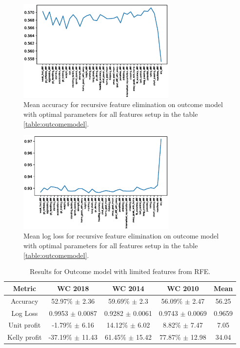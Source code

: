 \begin{figure}[H]
    \centering
    \includegraphics[width=0.7\textwidth]{img/optimal_avg_accuracy.eps}
    \caption{Mean accuracy for recursive feature elimination on outcome model with optimal parameters for all features setup in the table \ref{table:outcomemodel}.}
    \label{fig:optimal_avg_accu}
\end{figure}

\begin{figure}[H]
    \centering
    \includegraphics[width=0.7\textwidth]{img/optimal_avg_lloss.eps}
    \caption{Mean log loss for recursive feature elimination on outcome model with optimal parameters for all features setup in the table \ref{table:outcomemodel}.}
    \label{fig:optimal_avg_loss}
\end{figure}

\begin{table}
    \caption{Results for Outcome model with limited features from RFE.}
    \begin{tabular}{| c | c| c| c|c|}
        \hline
        Metric& \textbf{WC 2018} & \textbf{WC 2014} & \textbf{WC 2010} & Mean\\
        \hline
        Accuracy  & 52.97\% $\pm$ 2.36 & 59.69\% $\pm$ 2.3 & 56.09\% $\pm$ 2.47& 56.25 \\
        Log Loss & 0.9953 $\pm$ 0.0087 & 0.9282 $\pm$ 0.0061 & 0.9743 $\pm$ 0.0069& 0.9659 \\
        Unit profit  & -1.79\% $\pm$ 6.16 & 14.12\% $\pm$ 6.02 & 8.82\% $\pm$ 7.47& 7.05 \\
        Kelly profit  & -37.19\% $\pm$ 11.43 & 61.45\% $\pm$ 15.42 & 77.87\% $\pm$ 12.98& 34.04 \\
 \hline
    \end{tabular}
    \label{table:outcomemodel_rfe}
\end{table}

